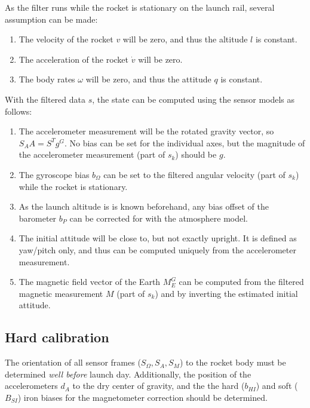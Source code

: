 As the filter runs while the rocket is stationary on the launch rail, several assumption can be made:
\begin{enumerate}
    \item The velocity of the rocket $v$ will be zero, and thus the altitude $l$ is constant.
    \item The acceleration of the rocket $\dot v$ will be zero.
    \item The body rates $\omega$ will be zero, and thus the attitude $q$ is constant.
\end{enumerate}
With the filtered data $s$, the state can be computed using the sensor models as follows:
\begin{enumerate}
    \item The accelerometer measurement will be the rotated gravity vector, so $S_A A = S^T g^G$. 
    No bias can be set for the individual axes, but the magnitude of the accelerometer measurement (part of $s_k$) should be $g$.
    
    \item The gyroscope bias $b_\Omega$ can be set to the filtered angular velocity (part of $s_k$) while the rocket is stationary.
    
    \item As the launch altitude is is known beforehand, any bias offset of the barometer $b_P$ can be corrected for with the atmosphere model. 
    
    \item The initial attitude will be close to, but not exactly upright.
    It is defined as yaw/pitch only, and thus can be computed uniquely from the accelerometer measurement.
    
    \item The magnetic field vector of the Earth $M_E^G$ can be computed from the filtered magnetic measurement $M$ (part of $s_k$) and by inverting the estimated initial attitude.
\end{enumerate}

\subsection{Hard calibration}
\label{sec:hard-calibration}
The orientation of all sensor frames ($S_\Omega, S_A, S_M$) to the rocket body must be determined \textit{well before} launch day.
Additionally, the position of the accelerometers $d_A$ to the dry center of gravity, and the the hard ($b_{HI}$) and soft ($B_{SI}$) iron biases for the magnetometer correction should be determined.

